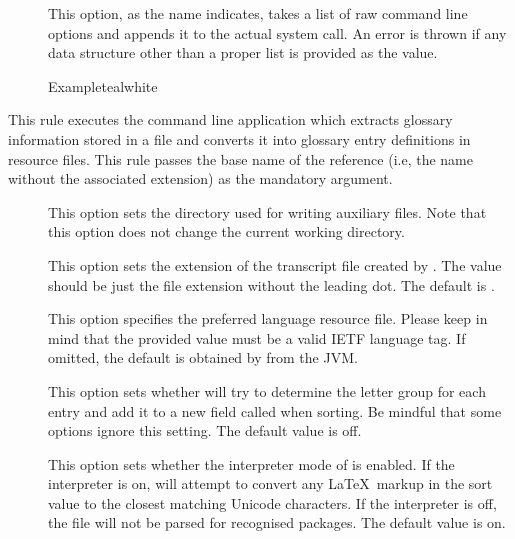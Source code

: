 \begin{description}
\begin{description}
\item[] This option, as the name indicates, takes a list of raw command line options and appends it to the actual system call. An error is thrown if any data structure other than a proper list is provided as the value.

\begin{codebox}{Example}{teal}{\icnote}{white}
\end{codebox}
\end{description}

\item[\rulebox{bib2gls}]
This rule executes the  command line application which extracts glossary information stored in a  file and converts it into glossary entry definitions in resource files. This rule passes the base name of the  reference (i.e, the name without the associated extension) as the mandatory argument.

\begin{description}
\item[] This option sets the directory used for writing auxiliary files. Note that this option does not change the current working directory.

\item[] This option sets the extension of the transcript file created by . The value should be just the file extension without the leading dot. The default is .

\item[] This option specifies the preferred language resource file. Please keep in mind that the provided value must be a valid \gls{IETF} language tag. If omitted, the default is obtained by  from the \gls{JVM}.

\item[] This option sets whether  will try to determine the letter group for each entry and add it to a new field called  when sorting. Be mindful that some  options ignore this setting. The default value is off.

\item[] This option sets whether the interpreter mode of  is enabled. If the interpreter is on,  will attempt to convert any \LaTeX\ markup in the sort value to the closest matching Unicode characters. If the interpreter is off, the  file will not be parsed for recognised packages. The default value is on.


\end{description}
\end{description}
